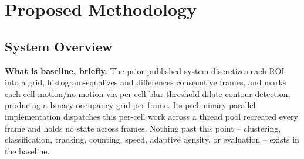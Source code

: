 \documentclass[conference]{IEEEtran}
\begin{document}
\section{Proposed Methodology}
\label{sec:methodology}

\subsection{System Overview}
\label{sec:overview}

\textbf{What is baseline, briefly.} The prior published system
\cite{baseline} discretizes each ROI into a grid, histogram-equalizes
and differences consecutive frames, and marks each cell
motion/no-motion via per-cell blur-threshold-dilate-contour detection,
producing a binary occupancy grid per frame. Its preliminary parallel
implementation dispatches this per-cell work across a thread pool
recreated every frame and holds no state across frames. Nothing past
this point -- clustering, classification, tracking, counting, speed,
adaptive density, or evaluation -- exists in the baseline.
\end{document}

